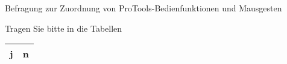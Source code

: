 \documentclass[11pt,a4paper,landscape,notitlepage]{article}
\begin{document}
\pagestyle{empty}
\centering 
\large{Befragung zur Zuordnung von ProTools-Bedienfunktionen und Mausgesten}

Tragen Sie bitte in die Tabellen 

\newpage

\begin{tabular}{|c|c|} \hline
j & n \\ \hline
\end{tabular}
\end{document}
